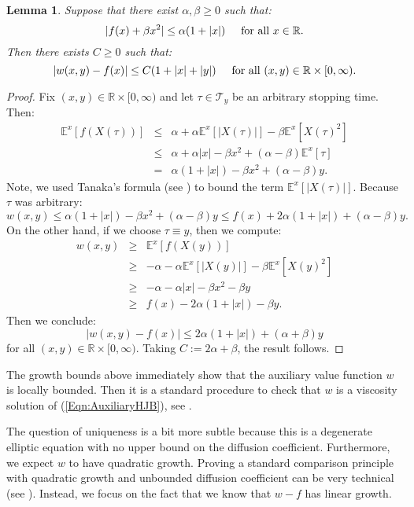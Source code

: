 \documentclass[11pt]{article}
\newtheorem{lem}{Lemma}
\begin{document}
\begin{lem}\label{Lem:AuxiliaryValueBounds}
Suppose that there exist $\alpha,\beta\geq 0$ such that:
\[|f(x)+\beta x^2|\leq\alpha(1+|x|)\hspace{0.5cm}\text{for all }x\in\mathbb{R}.\]
Then there exists $C\geq 0$ such that:
\[|w(x,y)-f(x)|\leq C(1+|x|+|y|)\hspace{0.5cm}\text{for all }(x,y)\in\mathbb{R}\times[0,\infty).\]\end{lem}
\begin{proof}
Fix $(x,y)\in\mathbb{R}\times[0,\infty)$ and let $\tau\in\mathcal{T}_y$ be an arbitrary stopping time. Then:
\begin{eqnarray}
\mathbb{E}^x\left[f(X(\tau))\right] & \leq & \alpha+\alpha\mathbb{E}^x\left[|X(\tau)|\right]-\beta\mathbb{E}^x\left[X(\tau)^2\right]\nonumber\\
& \leq & \alpha+\alpha|x|-\beta x^2+(\alpha-\beta)\mathbb{E}^x\left[\tau\right]\nonumber\\
& = & \alpha(1+|x|)-\beta x^2 +(\alpha-\beta)y.\nonumber
\end{eqnarray}
Note, we used Tanaka's formula (see \cite{KaratzasShreve1991}) to bound the term $\mathbb{E}^x\left[|X(\tau)|\right]$. Because $\tau$ was arbitrary:
\[w(x,y)\leq\alpha(1+|x|)-\beta x^2+(\alpha-\beta)y\leq f(x)+2\alpha(1+|x|)+(\alpha-\beta) y.\]
On the other hand, if we choose $\tau\equiv y$, then we compute:
\begin{eqnarray}
w(x,y) & \geq & \mathbb{E}^x\left[f(X(y))\right]\nonumber\\
& \geq & -\alpha-\alpha\mathbb{E}^x\left[|X(y)|\right]-\beta\mathbb{E}^x\left[X(y)^2\right]\nonumber\\
& \geq & -\alpha-\alpha|x|-\beta x^2-\beta y\nonumber\\
& \geq & f(x)-2\alpha(1+|x|)-\beta y.\nonumber
\end{eqnarray}
Then we conclude:
\[|w(x,y)-f(x)|\leq 2\alpha(1+|x|)+(\alpha+\beta)y\]
for all $(x,y)\in\mathbb{R}\times[0,\infty)$. Taking $C:=2\alpha+\beta$, the result follows.
\end{proof}

The growth bounds above immediately show that the auxiliary value function $w$ is locally bounded. Then it is a standard procedure to check that $w$ is a viscosity solution of (\ref{Eqn:AuxiliaryHJB}), see \cite{Touzi2013}.

The question of uniqueness is a bit more subtle because this is a degenerate elliptic equation with no upper bound on the diffusion coefficient. Furthermore, we expect $w$ to have quadratic growth. Proving a standard comparison principle with quadratic growth and unbounded diffusion coefficient can be very technical (see \cite{DaLioLey2010}). Instead, we focus on the fact that we know that $w-f$ has linear growth.
\end{document}
